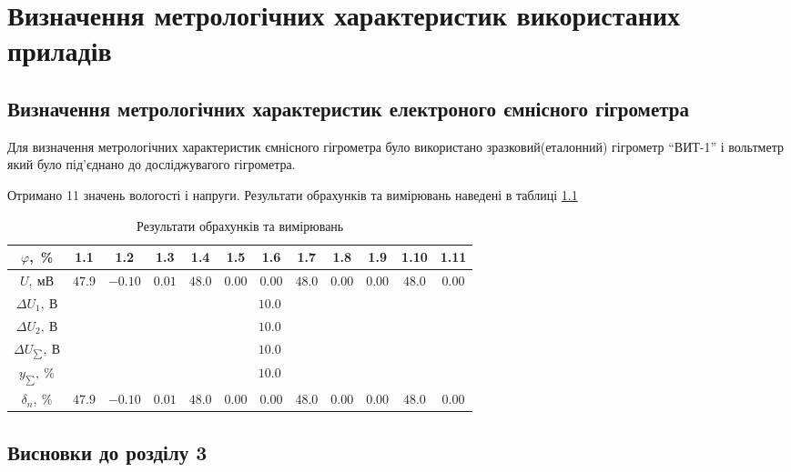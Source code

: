 \chapter{Визначення метрологічних характеристик використаних приладів}
\section{Визначення метрологічних характеристик електроного ємнісного гігрометра}

Для визначення метрологічних характеристик ємнісного гігрометра було використано
зразковий(еталонний) гігрометр ``ВИТ-1'' і вольтметр який було під’єднано до досліджувагого гігрометра.

Отримано 11 значень вологості і напруги. Результати обрахунків та вимірювань наведені в таблиці \ref{t:metrological_exp}

\begin{table}[ht!]
  \caption{Результати обрахунків та вимірювань}
  \label{t:metrological_exp}
\begin{tabular}{| c | c | c | c | c | c | c | c | c | c | c | c |}
\hline
\multicolumn{1}{|c|}{$\varphi$,~\%} &
\multicolumn{1}{c|}{1.1} &
\multicolumn{1}{c|}{1.2} &
\multicolumn{1}{c|}{1.3} &
\multicolumn{1}{c|}{1.4} &
\multicolumn{1}{c|}{1.5} &
\multicolumn{1}{c|}{1.6} &
\multicolumn{1}{c|}{1.7} &
\multicolumn{1}{c|}{1.8} &
\multicolumn{1}{c|}{1.9} &
\multicolumn{1}{c|}{1.10} &
\multicolumn{1}{c|}{1.11} \\ \hline
$U,~\text{мВ}$ & $47.9$ & $-0.10$ & $0.01$ & $48.0$ & $0.00$ & $0.00$ & $48.0$ & $0.00$ & $0.00$ & $48.0$ & $0.00$  \\ \hline 
$\Delta U_1,~\text{В}$ & \multicolumn{11}{|c|}{$10.0$}  \\ \hline
$\Delta U_2,~\text{В}$ & \multicolumn{11}{|c|}{$10.0$}  \\ \hline
$\Delta U_{\sum},~В $ & \multicolumn{11}{|c|}{$10.0$}  \\ \hline
$y_{\sum}, ~\% $ & \multicolumn{11}{|c|}{$10.0$}  \\ \hline
$\delta_n,~\%$ & $47.9$ & $-0.10$ & $0.01$ & $48.0$ & $0.00$ & $0.00$ & $48.0$ & $0.00$ & $0.00$ & $48.0$ & $0.00$  \\ \hline
\end{tabular}
\end{table}


\section*{Висновки до розділу 3}
